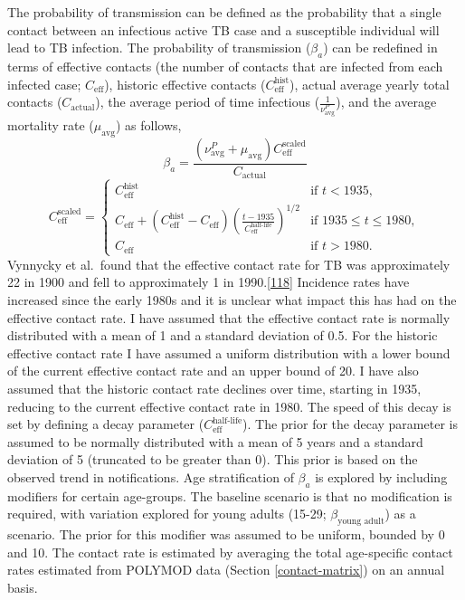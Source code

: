 \documentclass[11pt,twoside]{bristolthesis}
\begin{document}
  The probability of transmission can be defined as the probability that a single contact between an infectious active TB case and a susceptible individual will lead to TB infection. The probability of transmission (\(\beta_a\)) can be redefined in terms of effective contacts (the number of contacts that are infected from each infected case; \(C_{\text{eff}}\)), historic effective contacts (\(C^{\text{hist}}_{\text{eff}}\)), actual average yearly total contacts (\(C_{\text{actual}}\)), the average period of time infectious (\(\frac{1}{\nu_{\text{avg}}^{P}}\)), and the average mortality rate (\(\mu_{\text{avg}}\)) as follows,
  \begin{equation}
  \beta_a = \frac{(\nu_{\text{avg}}^{P} + \mu_{\text{avg}}) C^{\text{scaled}}_{\text{eff}}}{C_{\text{actual}}}
  \label{eq:beta-eq}
  \end{equation}
  \begin{equation}
  C^{\text{scaled}}_{\text{eff}} = \begin{cases}
  C^{\text{hist}}_{\text{eff}} & \text{if } t < 1935, \\
  C_{\text{eff}} + \left(C^{\text{hist}}_{\text{eff}} -  C_{\text{eff}} \right) \left(\frac{t-1935}{C^{\text{half-life}}_{\text{eff}}}\right)^{1/2} & \text{if } 1935 \leq t \leq 1980, \\
  C_{\text{eff}} & \text{if } t > 1980. \end{cases}
    \label{eq:scaled-contacts}
  \end{equation}
  Vynnycky et al.~found that the effective contact rate for TB was approximately 22 in 1900 and fell to approximately 1 in 1990.{[}\protect\hyperlink{ref-Vynnycky1999}{118}{]} Incidence rates have increased since the early 1980s and it is unclear what impact this has had on the effective contact rate. I have assumed that the effective contact rate is normally distributed with a mean of 1 and a standard deviation of 0.5. For the historic effective contact rate I have assumed a uniform distribution with a lower bound of the current effective contact rate and an upper bound of 20. I have also assumed that the historic contact rate declines over time, starting in 1935, reducing to the current effective contact rate in 1980. The speed of this decay is set by defining a decay parameter (\(C^{\text{half-life}}_{\text{eff}}\)). The prior for the decay parameter is assumed to be normally distributed with a mean of 5 years and a standard deviation of 5 (truncated to be greater than 0). This prior is based on the observed trend in notifications. Age stratification of \(\beta_a\) is explored by including modifiers for certain age-groups. The baseline scenario is that no modification is required, with variation explored for young adults (15-29; \(\beta_{\text{young adult}}\)) as a scenario. The prior for this modifier was assumed to be uniform, bounded by 0 and 10. The contact rate is estimated by averaging the total age-specific contact rates estimated from POLYMOD data (Section \ref{contact-matrix}) on an annual basis.
  
\end{document}
